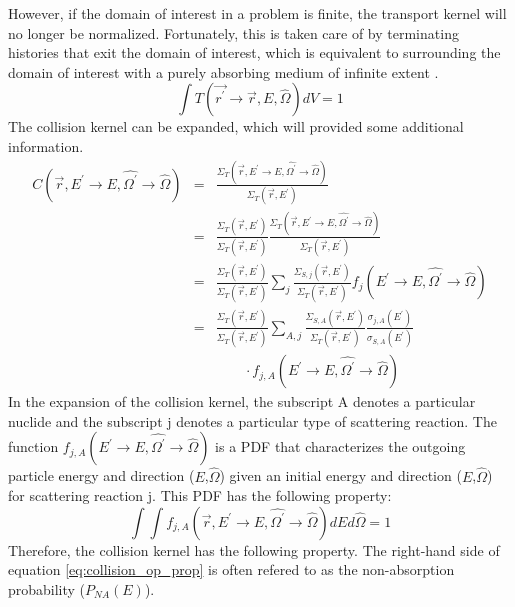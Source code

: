 However, if the 
domain of interest in a problem is finite, the transport kernel will no longer
be normalized. Fortunately, this is taken care of by terminating histories 
that exit the domain of interest, which is equivalent to surrounding the domain
of interest with a purely absorbing medium of infinite extent 
\citep{irving_adjoint_1971}.
\begin{equation}
  \int T(\vec{r^{'}} \to \vec{r},E,\hat{\Omega})dV = 1
\end{equation}
The collision kernel can be expanded, which will provided some additional 
information. 
\begin{eqnarray}
  C(\vec{r},E^{'} \to E, \hat{\Omega^{'}} \to \hat{\Omega}) & = &
  \frac{\Sigma_T(\vec{r},E^{'} \to E,\hat{\Omega^{'}} \to \hat{\Omega})}
       {\Sigma_T(\vec{r},E^{'})} \nonumber \\
  \quad & = & \frac{\Sigma_T(\vec{r},E^{'})}{\Sigma_T(\vec{r},E^{'})}
  \frac{\Sigma_T(\vec{r},E^{'} \to E,\hat{\Omega^{'}} \to \hat{\Omega})}
       {\Sigma_T(\vec{r},E^{'})} \nonumber \\
  & = & \frac{\Sigma_T(\vec{r},E^{'})}{\Sigma_T(\vec{r},E^{'})} \sum_j
        \frac{\Sigma_{S,j}(\vec{r},E^{'})}{\Sigma_T(\vec{r},E^{'})}
        f_j(E^{'} \to E,\hat{\Omega^{'}} \to \hat{\Omega}) \nonumber\\
  & = & \frac{\Sigma_T(\vec{r},E^{'})}{\Sigma_T(\vec{r},E^{'})}
        \sum_{A,j} \frac{\Sigma_{S,A}(\vec{r},E^{'})}{\Sigma_T(\vec{r},E^{'})}  
        \frac{\sigma_{j,A}(E^{'})}{\sigma_{S,A}(E^{'})}  \\
        && \qquad \cdot
        f_{j,A}(E^{'} \to E,\hat{\Omega^{'}} \to \hat{\Omega}) \nonumber
\end{eqnarray}
In the expansion of the collision kernel, the subscript A denotes a particular
nuclide and the subscript j denotes a particular type of scattering reaction. 
The function 
$f_{j,A}(E^{'} \to E,\hat{\Omega^{'}} \to \hat{\Omega})$ is a PDF that 
characterizes the outgoing particle energy and direction ($E$,$\hat{\Omega}$) 
given an initial energy and direction ($E$,$\hat{\Omega}$) for scattering 
reaction j. This PDF has the following property:
\begin{equation}
  \int\int f_{j,A}(\vec{r},E^{'} \to E,\hat{\Omega^{'}} \to \hat{\Omega}) 
  dEd\hat{\Omega} = 1
\end{equation}
Therefore, the collision kernel has the following property. The right-hand 
side of equation \ref{eq:collision_op_prop} is often refered to as the 
non-absorption probability ($P_{NA}(E)$).
